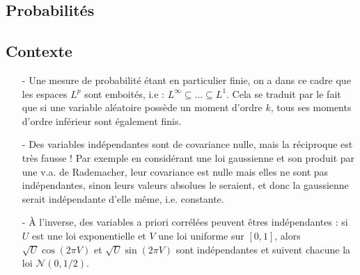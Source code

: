 \documentclass[11pt,a4paper]{article}
\begin{document}
\newpage
\begin{center}
\section*{Probabilités} 
\end{center}







\subsection*{Contexte}
\begin{itemize}
\item[-] Une mesure de probabilité étant en particulier finie, on a dans ce cadre que les espaces $L^p$ sont emboités, i.e : $L^\infty \subseteq \dots \subseteq L^1$. Cela se traduit par le fait que si une variable aléatoire possède un moment d'ordre $k$, tous ses moments d'ordre inférieur sont également finis.
\item[-] Des variables indépendantes sont de covariance nulle, mais la réciproque est très fausse ! Par exemple en considérant une loi gaussienne et son produit par une v.a. de Rademacher, leur covariance est nulle mais elles ne sont pas indépendantes, sinon leurs valeurs absolues le seraient, et donc la gaussienne serait indépendante d'elle même, i.e. constante.
\item[-] À l'inverse, des variables a priori corrélées peuvent êtres indépendantes : si $U$ est une loi exponentielle et $V$ une loi uniforme sur $[0,1]$, alors $\sqrt{U}\cos(2\pi V)$ et $\sqrt{U}\sin(2\pi V)$ sont indépendantes et suivent chacune la loi $\mathcal{N}(0,1/2)$.
\end{itemize}
\end{document}
